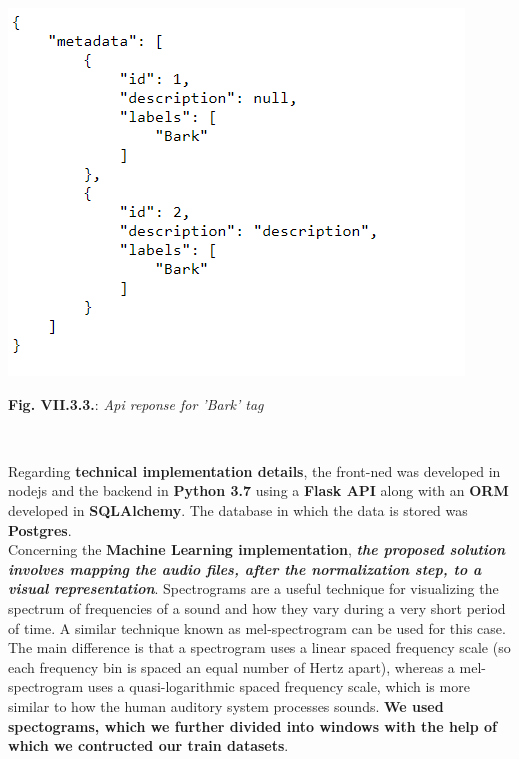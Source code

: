 \documentclass[11pt, a4papper]{report}
\theoremstyle{plain}
\theoremstyle{definition}
\theoremstyle{definition}
\theoremstyle{proposition}
\begin{document}
\begin{center}
\includegraphics[scale=0.5]{mocked-api-response.png}
\end{center}
\begin{center}
\textbf{Fig. VII.3.3.}: \textit{Api reponse for 'Bark' tag}
\end{center}
\

Regarding \textbf{technical implementation details}, the front-ned was developed in nodejs and the backend in \textbf{Python 3.7} using a \textbf{Flask API} along with an \textbf{ORM} developed in \textbf{SQLAlchemy}. The database in which the data is stored was \textbf{Postgres}.
\\

Concerning the \textbf{Machine Learning implementation}, \textbf{\textit{the proposed solution involves mapping the audio files, after the normalization step, to a visual representation}}. Spectrograms are a useful technique for visualizing the spectrum of frequencies of a sound and how they vary during a very short period of time. A similar technique known as mel-spectrogram can be used for this case. The main difference is that a spectrogram uses a linear spaced frequency scale (so each frequency bin is spaced an equal number of Hertz apart), whereas a mel-spectrogram uses a quasi-logarithmic spaced frequency scale, which is more similar to how the human auditory system processes sounds. \textbf{We used spectograms, which we further divided into windows with the help of which we contructed our train datasets}. 
\end{document}
